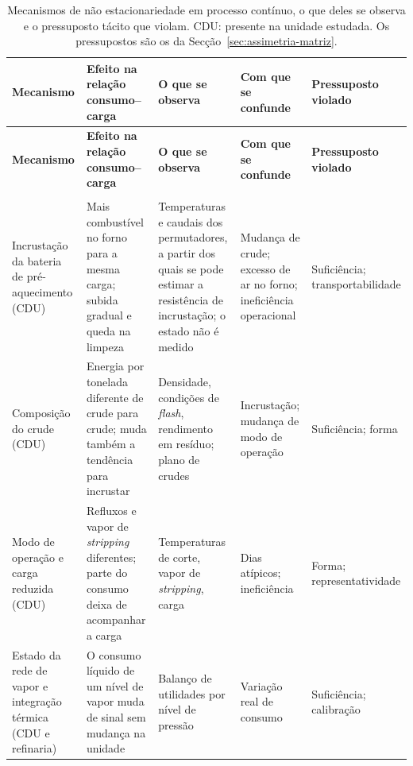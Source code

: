 {\footnotesize
\begin{xltabular}{\textwidth}{@{}>{\raggedright\arraybackslash}p{2.3cm} >{\raggedright\arraybackslash}X >{\raggedright\arraybackslash}X >{\raggedright\arraybackslash}X >{\raggedright\arraybackslash}p{2.1cm}@{}}
\caption[Mecanismos de processo contínuo e pressupostos que violam]{Mecanismos de não estacionariedade em processo contínuo, o que deles se observa e o pressuposto tácito que violam. CDU: presente na unidade estudada. Os pressupostos são os da Secção~\ref{sec:assimetria-matriz}.}\label{tab:mecanismos-pressupostos}\\
\toprule
\textbf{Mecanismo} & \textbf{Efeito na relação consumo--carga} & \textbf{O que se observa} & \textbf{Com que se confunde} & \textbf{Pressuposto violado} \\
\midrule
\endfirsthead
\toprule
\textbf{Mecanismo} & \textbf{Efeito na relação consumo--carga} & \textbf{O que se observa} & \textbf{Com que se confunde} & \textbf{Pressuposto violado} \\
\midrule
\endhead
\midrule
{}\\
\endfoot
\bottomrule
\endlastfoot
    Incrustação da bateria de pré-aquecimento (CDU) & Mais combustível no forno para a mesma carga; subida gradual e queda na limpeza & Temperaturas e caudais dos permutadores, a partir dos quais se pode estimar a resistência de incrustação; o estado não é medido & Mudança de crude; excesso de ar no forno; ineficiência operacional & Suficiência; transportabilidade \\
    \addlinespace
    Composição do crude (CDU) & Energia por tonelada diferente de crude para crude; muda também a tendência para incrustar & Densidade, condições de \emph{flash}, rendimento em resíduo; plano de crudes & Incrustação; mudança de modo de operação & Suficiência; forma \\
    \addlinespace
    Modo de operação e carga reduzida (CDU) & Refluxos e vapor de \emph{stripping} diferentes; parte do consumo deixa de acompanhar a carga & Temperaturas de corte, vapor de \emph{stripping}, carga & Dias atípicos; ineficiência & Forma; representatividade \\
    \addlinespace
    Estado da rede de vapor e integração térmica (CDU e refinaria) & O consumo líquido de um nível de vapor muda de sinal sem mudança na unidade & Balanço de utilidades por nível de pressão & Variação real de consumo & Suficiência; calibração \\

\end{xltabular}}
